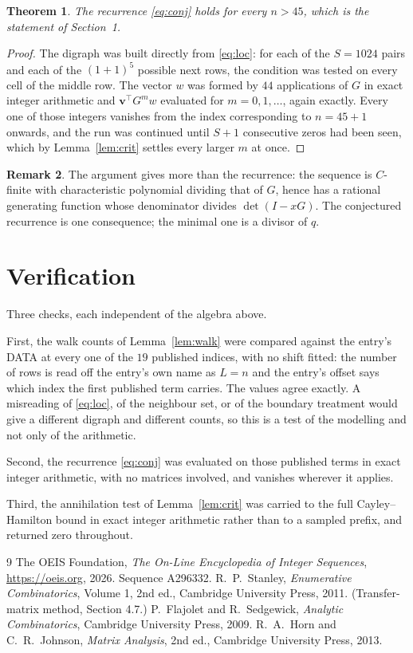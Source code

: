 \documentclass[11pt,a4paper]{article}
\theoremstyle{plain}
\newtheorem{theorem}{Theorem}
\theoremstyle{definition}
\newtheorem{remark}[theorem]{Remark}
\begin{document}
\begin{theorem}
The recurrence \eqref{eq:conj} holds for every $n>45$, which is the statement of
Section~1.
\end{theorem}

\begin{proof}
The digraph was built directly from \eqref{eq:loc}: for each of the $S=1024$ pairs and each
of the $(1+1)^{5}$ possible next rows, the condition was tested on every cell of
the middle row. The vector $w$ was formed by $44$ applications of $G$ in exact integer
arithmetic and $\mathbf{v}^{\!\top}G^{m}w$ evaluated for $m=0,1,\dots$, again exactly.
Every one of those integers vanishes from the index corresponding to $n=45+1$ onwards,
and the run was continued until $S+1$ consecutive zeros had been seen, which by
Lemma~\ref{lem:crit} settles every larger $m$ at once.
\end{proof}

\begin{remark}
The argument gives more than the recurrence: the sequence is $C$-finite with characteristic
polynomial dividing that of $G$, hence has a rational generating function whose denominator
divides $\det(I-xG)$. The conjectured recurrence is one consequence; the minimal one is a
divisor of $q$.
\end{remark}

\section{Verification}

Three checks, each independent of the algebra above.

First, the walk counts of Lemma~\ref{lem:walk} were compared against the entry's DATA at
every one of the $19$ published indices, with no shift fitted: the number of rows is
read off the entry's own name as $L=n$ and the entry's offset says which index the first
published term carries. The values agree exactly. A misreading of \eqref{eq:loc}, of the
neighbour set, or of the boundary treatment would give a different digraph and different
counts, so this is a test of the modelling and not only of the arithmetic.

Second, the recurrence \eqref{eq:conj} was evaluated on those published terms in exact
integer arithmetic, with no matrices involved, and vanishes wherever it applies.

Third, the annihilation test of Lemma~\ref{lem:crit} was carried to the full
Cayley--Hamilton bound in exact integer arithmetic rather than to a sampled prefix, and
returned zero throughout.

\begin{thebibliography}{9}
 The OEIS Foundation, \emph{The On-Line Encyclopedia of Integer
Sequences}, \url{https://oeis.org}, 2026. Sequence A296332.
 R.~P.~Stanley, \emph{Enumerative Combinatorics}, Volume 1, 2nd ed.,
Cambridge University Press, 2011. (Transfer-matrix method, Section 4.7.)
 P.~Flajolet and R.~Sedgewick, \emph{Analytic Combinatorics}, Cambridge
University Press, 2009.
 R.~A.~Horn and C.~R.~Johnson, \emph{Matrix Analysis}, 2nd ed., Cambridge
University Press, 2013.
\end{thebibliography}
\end{document}
